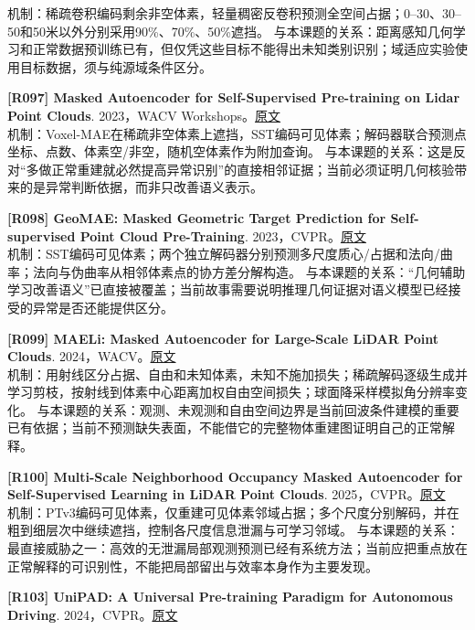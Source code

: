 \documentclass[11pt,a4paper]{article}
\begin{document}
机制：稀疏卷积编码剩余非空体素，轻量稠密反卷积预测全空间占据；0–30、30–50和50米以外分别采用90\%、70\%、50\%遮挡。 与本课题的关系：距离感知几何学习和正常数据预训练已有，但仅凭这些目标不能得出未知类别识别；域适应实验使用目标数据，须与纯源域条件区分。\par\medskip
\hypertarget{R097}{}\textbf{[R097] Masked Autoencoder for Self-Supervised Pre-training on Lidar Point Clouds}. 2023，WACV Workshops。\href{https://arxiv.org/pdf/2207.00531}{原文}\\
机制：Voxel-MAE在稀疏非空体素上遮挡，SST编码可见体素；解码器联合预测点坐标、点数、体素空/非空，随机空体素作为附加查询。 与本课题的关系：这是反对“多做正常重建就必然提高异常识别”的直接相邻证据；当前必须证明几何核验带来的是异常判断依据，而非只改善语义表示。\par\medskip
\hypertarget{R098}{}\textbf{[R098] GeoMAE: Masked Geometric Target Prediction for Self-supervised Point Cloud Pre-Training}. 2023，CVPR。\href{https://arxiv.org/pdf/2305.08808}{原文}\\
机制：SST编码可见体素；两个独立解码器分别预测多尺度质心/占据和法向/曲率；法向与伪曲率从相邻体素点的协方差分解构造。 与本课题的关系：“几何辅助学习改善语义”已直接被覆盖；当前故事需要说明推理几何证据对语义模型已经接受的异常是否还能提供区分。\par\medskip
\hypertarget{R099}{}\textbf{[R099] MAELi: Masked Autoencoder for Large-Scale LiDAR Point Clouds}. 2024，WACV。\href{https://arxiv.org/pdf/2212.07207v2}{原文}\\
机制：用射线区分占据、自由和未知体素，未知不施加损失；稀疏解码逐级生成并学习剪枝，按射线到体素中心距离加权自由空间损失；球面降采样模拟角分辨率变化。 与本课题的关系：观测、未观测和自由空间边界是当前回波条件建模的重要已有依据；当前不预测缺失表面，不能借它的完整物体重建图证明自己的正常解释。\par\medskip
\hypertarget{R100}{}\textbf{[R100] Multi-Scale Neighborhood Occupancy Masked Autoencoder for Self-Supervised Learning in LiDAR Point Clouds}. 2025，CVPR。\href{https://openaccess.thecvf.com/content/CVPR2025/papers/Abdelsamad_Multi-Scale_Neighborhood_Occupancy_Masked_Autoencoder_for_Self-Supervised_Learning_in_LiDAR_CVPR_2025_paper.pdf}{原文}\\
机制：PTv3编码可见体素，仅重建可见体素邻域占据；多个尺度分别解码，并在粗到细层次中继续遮挡，控制各尺度信息泄漏与可学习邻域。 与本课题的关系：最直接威胁之一：高效的无泄漏局部观测预测已经有系统方法；当前应把重点放在正常解释的可识别性，不能把局部留出与效率本身作为主要发现。\par\medskip
\hypertarget{R103}{}\textbf{[R103] UniPAD: A Universal Pre-training Paradigm for Autonomous Driving}. 2024，CVPR。\href{https://arxiv.org/pdf/2310.08370v2}{原文}\\
\end{document}
